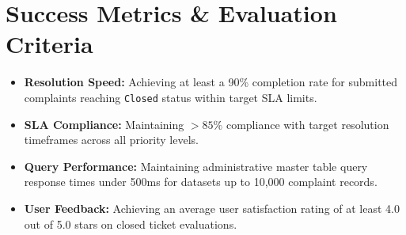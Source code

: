 \documentclass[12pt, a4paper]{article}
\begin{document}
\section{Success Metrics \& Evaluation Criteria}

\begin{itemize}[leftmargin=*]
    \item \textbf{Resolution Speed:} Achieving at least a 90\% completion rate for submitted complaints reaching \texttt{Closed} status within target SLA limits.
    \item \textbf{SLA Compliance:} Maintaining $>85\%$ compliance with target resolution timeframes across all priority levels.
    \item \textbf{Query Performance:} Maintaining administrative master table query response times under 500ms for datasets up to 10,000 complaint records.
    \item \textbf{User Feedback:} Achieving an average user satisfaction rating of at least 4.0 out of 5.0 stars on closed ticket evaluations.
\end{itemize}
\end{document}
